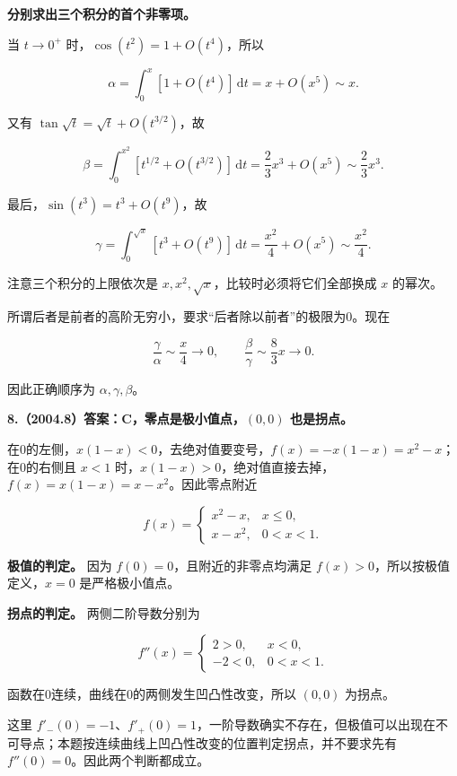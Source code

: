 \documentclass[UTF8,11pt,fontset=windows]{ctexart}
\begin{document}
\textbf{分别求出三个积分的首个非零项。}

当 $t\to0^+$ 时，$\cos(t^2)=1+O(t^4)$，所以

$$
\alpha=\int_0^x[1+O(t^4)]\,\mathrm dt=x+O(x^5)\sim x.
$$

又有 $\tan\sqrt t=\sqrt t+O(t^{3/2})$，故

$$
\beta=\int_0^{x^2}[t^{1/2}+O(t^{3/2})]\,\mathrm dt
=\frac23x^3+O(x^5)\sim\frac23x^3.
$$

最后，$\sin(t^3)=t^3+O(t^9)$，故

$$
\gamma=\int_0^{\sqrt x}[t^3+O(t^9)]\,\mathrm dt
=\frac{x^2}{4}+O(x^5)\sim\frac{x^2}{4}.
$$

注意三个积分的上限依次是 $x,x^2,\sqrt x$，比较时必须将它们全部换成 $x$ 的幂次。

所谓后者是前者的高阶无穷小，要求“后者除以前者”的极限为0。现在

$$
\frac\gamma\alpha\sim\frac{x}{4}\to0,
\qquad \frac\beta\gamma\sim\frac83x\to0.
$$

因此正确顺序为 $\boxed{\alpha,\gamma,\beta}$。

\clearpage

\textbf{8.（2004.8）答案：C，零点是极小值点，$(0,0)$ 也是拐点。}

在0的左侧，$x(1-x)<0$，去绝对值要变号，$f(x)=-x(1-x)=x^2-x$；在0的右侧且 $x<1$ 时，$x(1-x)>0$，绝对值直接去掉，$f(x)=x(1-x)=x-x^2$。因此零点附近

$$
f(x)=\begin{cases}x^2-x,&x\le0,\\x-x^2,&0<x<1.\end{cases}
$$

\textbf{极值的判定。} 因为 $f(0)=0$，且附近的非零点均满足 $f(x)>0$，所以按极值定义，$x=0$ 是严格极小值点。

\textbf{拐点的判定。} 两侧二阶导数分别为

$$
f''(x)=\begin{cases}2>0,&x<0,\\-2<0,&0<x<1.\end{cases}
$$

函数在0连续，曲线在0的两侧发生凹凸性改变，所以 $(0,0)$ 为拐点。

这里 $f'_-(0)=-1$、$f'_+(0)=1$，一阶导数确实不存在，但极值可以出现在不可导点；本题按连续曲线上凹凸性改变的位置判定拐点，并不要求先有 $f''(0)=0$。因此两个判断都成立。

\clearpage
\end{document}
